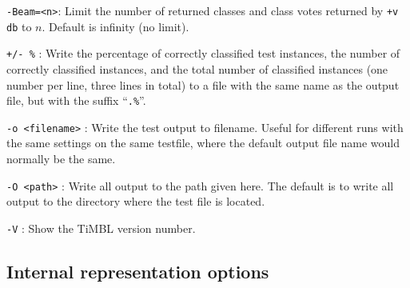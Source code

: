\documentclass{report}
\begin{document}
\begin{description}
\item {\tt -Beam=<n>}: Limit the number of returned classes and class
  votes returned by {\tt +v db} to $n$. Default is infinity (no limit).

\item {\tt +/- \%} : Write the percentage of correctly classified test
  instances, the number of correctly classified instances, and the
  total number of classified instances (one number per line, three
  lines in total) to a file with the same name as the output file, but
  with the suffix ``{\tt .\%}''.

\item {\tt -o <filename>} : Write the test output to filename. Useful
  for different runs with the same settings on the same testfile,
  where the default output file name would normally be the same.

\item {\tt -O <path>} : Write all output to the path given here. The
  default is to write all output to the directory where the test file
  is located.

\item {\tt -V} : Show the TiMBL version number.

\end{description}

\subsection{Internal representation options}
\end{document}

